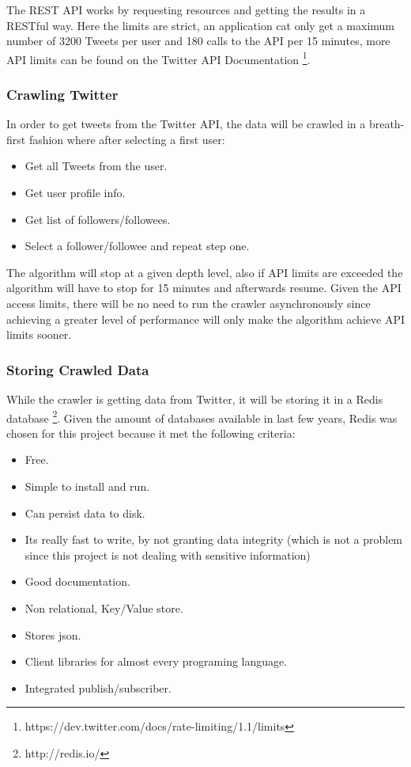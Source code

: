  The REST API works by requesting resources and getting the results in a RESTful way. Here the limits are strict, an application cat only get a maximum number of 3200 Tweets per user and 180 calls to the API per 15 minutes, more API limits can be found on the Twitter API Documentation \footnote{https://dev.twitter.com/docs/rate-limiting/1.1/limits}.

\subsubsection{Crawling Twitter} %
\label{sub:crawling_twitter}
In order to get tweets from the Twitter API, the data will be crawled in a breath-first fashion where after selecting a first user:

\begin{itemize}
  \item Get all Tweets from the user.
  \item Get user profile info.
  \item Get list of followers/followees.
  \item Select a follower/followee and repeat step one.
\end{itemize}

The algorithm will stop at a given depth level, also if API limits are exceeded the algorithm will have to stop for 15 minutes and afterwards resume. Given the API access limits, there will be no need to run the crawler asynchronously since achieving a greater level of performance will only make the algorithm achieve API limits sooner.

\subsubsection{Storing Crawled Data} %
\label{sub:storing_crawled_data}
While the crawler is getting data from Twitter, it will be storing it in a Redis database \footnote{http://redis.io/}. Given the amount of databases available in last few years, Redis was chosen for this project because it met the following criteria:
\begin{itemize}
  \item Free.
  \item Simple to install and run. 
  \item Can persist data to disk.
  \item Its really fast to write, by not granting data integrity (which is not a problem since this project is not dealing with sensitive information)
  \item Good documentation.
  \item Non relational, Key/Value store.
  \item Stores json.
  \item Client libraries for almost every programing language.
  \item Integrated publish/subscriber.
\end{itemize}

